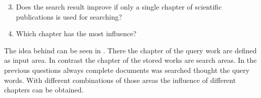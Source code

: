 \begin{enumerate}[label=1.\arabic*]
  \setcounter{enumi}{2}
    \item Does the search result improve if only a single chapter of scientific publications is used for searching?
    \item Which chapter has the most influence?
\end{enumerate}

The idea behind can be seen in . There the chapter of the query work are defined as input area. In contrast the chapter of the stored works are search areas. In the previous questions always complete documents was searched thought the query words. With different combinations of those areas the influence of different chapters can be obtained.
